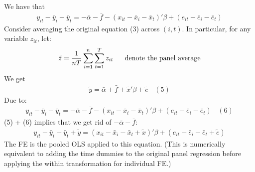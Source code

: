 \documentclass[a4paper,twoside,11pt]{article}
\begin{document}
We have that
\begin{equation*}
\begin{aligned}
y_{it} - \bar y_i - \bar y_t = - \bar \alpha - \bar f - (x_{it} - \bar x_i - \bar x_t)' \beta + (e_{it} - \bar e_i - \bar e_t)
\end{aligned}
\end{equation*}
Consider averaging the original equation (3) across $(i,t)$. In particular, for any variable $z_{it}$, let:
\begin{equation*}
\begin{aligned}
\tilde{z} = \frac{1}{nT} \sum^n_{i=1} \sum^T_{t=1} z_{it} \ \ \ \ \ \textmd{denote the panel average}
\end{aligned}
\end{equation*}
We get
\begin{equation*}
\begin{aligned}
\tilde{y} = \bar \alpha + \bar f + \tilde{x}' \beta + \tilde{e} \ \ \ \ (5)
\end{aligned} 
\end{equation*}
Due to:
\begin{equation*}
\begin{aligned}
y_{it} - \bar y_i - \bar y_t = - \bar \alpha - \bar f - (x_{it} - \bar x_i - \bar x_t)'\beta + (e_{it} - \bar e_i - \bar e_t) \ \ \ \ (6)
\end{aligned} 
\end{equation*}
(5) + (6) implies that we get rid of $- \bar \alpha - \bar f:$
\begin{equation*}
\begin{aligned}
y_{it} -  \bar y_i - \bar y_t + \tilde{y} = (x_{it} - \bar x_i -  \bar x_t + \tilde{x})' \beta + (e_{it} - \bar e_i - \bar e_t + \tilde{e})
\end{aligned} 
\end{equation*}
The FE is the pooled OLS applied to this equation. (This is numerically equivalent to adding the time dummies to the original
panel regression before applying the within transformation for individual
FE.)
\end{document}
